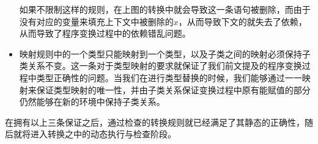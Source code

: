 \begin{itemize}
如果不限制这样的规则，在上图的转换中就会导致这一条语句被删除，而由于没有对应的变量来填充上下文中被删除的$x$，从而导致下文的就失去了依赖，从而导致了程序变换过程中的依赖错乱问题。

\item 映射规则中的一个类型只能映射到一个类型，以及子类之间的映射必须保持子类关系不变。这一条对于类型映射的要求就保证了我们前文提及的程序变换过程中类型正确性的问题。当我们在进行类型替换的时候，我们能够通过一一映射来保证类型映射的唯一性，并由子类关系保证变换过程中原有能赋值的部分仍然能够在新的环境中保持子类关系。
\end{itemize}

在拥有以上三条保证之后，通过检查的转换规则就已经满足了其静态的正确性，随后就将进入转换之中的动态执行与检查阶段。
